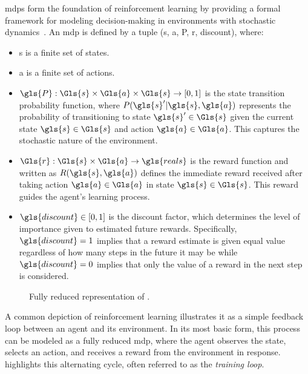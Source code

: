 \Glspl{mdp} form the foundation of reinforcement learning by providing 
a formal framework for modeling decision-making in environments with 
stochastic dynamics~\cite{puterman2005}. An \gls{mdp} is defined by a tuple 
(\Gls{s}, \Gls{a}, \gls{P}, \Gls{r}, \gls{discount}), where:
\begin{itemize}
    \item \Gls{s} is a finite set of states.
    \item \Gls{a} is a finite set of actions.
    \item \(\gls{P}: \Gls{s} \times \Gls{a} \times \Gls{s} \rightarrow [0,1]\) is the state 
        transition probability function, where \(P(\gls{s}^\prime|\gls{s}, \gls{a})\) 
        represents the probability of transitioning to state \(\gls{s}^\prime\in \Gls{s}\)
        given the current state \(\gls{s}\in \Gls{s}\) and action \(\gls{a}\in \Gls{a}\).
        This captures the stochastic nature of the environment.
    \item \(\Gls{r}: \Gls{s} \times \Gls{a} \rightarrow \gls{reals}\) is the reward 
        function and written as \(R(\gls{s}, \gls{a})\) defines the immediate reward 
        received after taking action \(\gls{a}\in \Gls{a}\) in state \(\gls{s}\in \Gls{s}\). 
        This reward guides the agent's learning process.
    \item \(\gls{discount} \in [0, 1]\) is the discount factor, which 
        determines the level of importance given to estimated future rewards. 
        Specifically, \(\gls{discount}=1\) implies that a reward estimate is 
        given equal value regardless of how many steps in the future it may 
        be while \(\gls{discount}=0\) implies that only the value of a 
        reward in the next step is considered.
\end{itemize}

\begin{figure}
    \centering
    
    \caption{Fully reduced  
        representation of .}
    \label{fig:mdp_cycle}
\end{figure}

A common depiction of reinforcement learning illustrates it as a simple 
feedback loop between an agent and its environment. In its most basic form, 
this process can be modeled as a fully reduced \gls{mdp}, where the agent observes
the state, selects an action, and receives a reward from the environment in response. 
 highlights this alternating cycle, often referred to as the 
\emph{training loop}.

